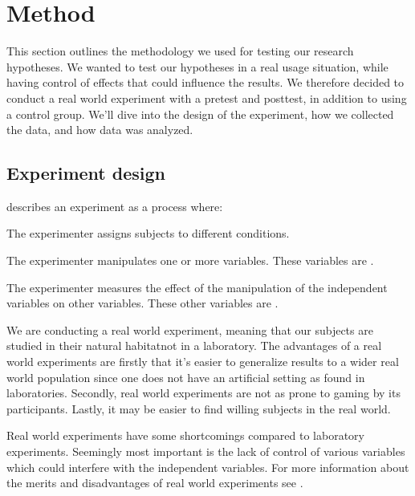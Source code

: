\section{Method}
\label{section:empirical.methodology}

This section outlines the methodology we used for testing our research
hypotheses. We wanted to test our hypotheses in a real usage situation, while
having control of effects that could influence the results. We therefore
decided to conduct a real world experiment with a pretest and posttest, in
addition to using a control group.
We'll dive into the design of the experiment, how we collected
the data, and how data was analyzed.

\subsection{Experiment design}
\label{section:empirical.methodology.experiment.design}

\citet[]{robson93} describes an experiment as a process where:


\begin{items}
  \item The experimenter assigns subjects to different conditions.
  \item The experimenter manipulates one or more variables.
    These variables are .
  \item The experimenter measures the effect of the manipulation of
    the independent variables on other variables. These other
    variables are .
\end{items}

We are conducting a real world experiment, meaning that our subjects
are studied in their natural habitat\dash{}not in a laboratory.
The advantages of a real world experiments are firstly that it's easier to
generalize results to a wider real world population since one does not have
an artificial setting as found in laboratories. Secondly, real world
experiments are not as prone to gaming by its participants. Lastly, it may be
easier to find willing subjects in the real world.

Real world experiments have some shortcomings compared to laboratory
experiments. Seemingly most important is the lack of control of various
variables which could interfere with the independent variables.
For more information about the merits and disadvantages of real world
experiments see \citet[]{robson93}.

